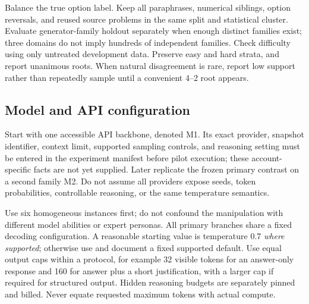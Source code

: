 \documentclass[11pt]{article}
\begin{document}
Balance the true option label. Keep all paraphrases, numerical siblings, option reversals, and reused source problems in the same split and statistical cluster. Evaluate generator-family holdout separately when enough distinct families exist; three domains do not imply hundreds of independent families. Check difficulty using only untreated development data. Preserve easy and hard strata, and report unanimous roots. When natural disagreement is rare, report low support rather than repeatedly sample until a convenient 4--2 root appears.

\subsection{Model and API configuration}
Start with one accessible API backbone, denoted M1. Its exact provider, snapshot identifier, context limit, supported sampling controls, and reasoning setting must be entered in the experiment manifest before pilot execution; these account-specific facts are not yet supplied. Later replicate the frozen primary contrast on a second family M2. Do not assume all providers expose seeds, token probabilities, controllable reasoning, or the same temperature semantics.

Use six homogeneous instances first; do not confound the manipulation with different model abilities or expert personas. All primary branches share a fixed decoding configuration. A reasonable starting value is temperature 0.7 \emph{where supported}; otherwise use and document a fixed supported default. Use equal output caps within a protocol, for example 32 visible tokens for an answer-only response and 160 for answer plus a short justification, with a larger cap if required for structured output. Hidden reasoning budgets are separately pinned and billed. Never equate requested maximum tokens with actual compute.
\end{document}
